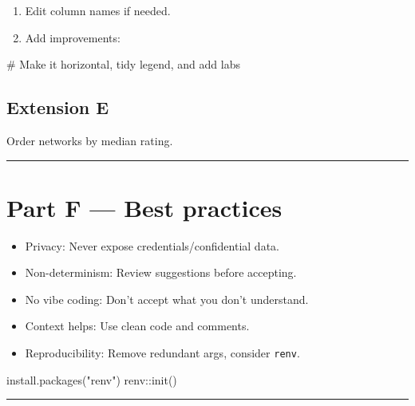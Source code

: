 \documentclass[
  letterpaper,
  DIV=11,
  numbers=noendperiod]{scrreprt}
\newenvironment{Shaded}{\begin{snugshade}}{\end{snugshade}}
\newcommand{\CommentTok}[1]{\textcolor[rgb]{0.37,0.37,0.37}{#1}}
\newcommand{\FunctionTok}[1]{\textcolor[rgb]{0.28,0.35,0.67}{#1}}
\newcommand{\NormalTok}[1]{\textcolor[rgb]{0.00,0.23,0.31}{#1}}
\newcommand{\SpecialCharTok}[1]{\textcolor[rgb]{0.37,0.37,0.37}{#1}}
\newcommand{\StringTok}[1]{\textcolor[rgb]{0.13,0.47,0.30}{#1}}
\providecommand{\tightlist}{%
  \setlength{\itemsep}{0pt}\setlength{\parskip}{0pt}}
\begin{document}
\begin{enumerate}
\def\labelenumi{\arabic{enumi}.}
\setcounter{enumi}{1}
\tightlist
\item
  Edit column names if needed.
\item
  Add improvements:
\end{enumerate}

\begin{Shaded}
\begin{Highlighting}[]
\CommentTok{\# Make it horizontal, tidy legend, and add labs}
\end{Highlighting}
\end{Shaded}

\subsection{Extension E}\label{extension-e}

Order networks by median rating.

\begin{center}\rule{0.5\linewidth}{0.5pt}\end{center}

\section{Part F --- Best practices}\label{part-f-best-practices}

\begin{itemize}
\tightlist
\item
  Privacy: Never expose credentials/confidential data.
\item
  Non-determinism: Review suggestions before accepting.
\item
  No vibe coding: Don't accept what you don't understand.
\item
  Context helps: Use clean code and comments.
\item
  Reproducibility: Remove redundant args, consider \texttt{renv}.
\end{itemize}

\begin{Shaded}
\begin{Highlighting}[]
\FunctionTok{install.packages}\NormalTok{(}\StringTok{"renv"}\NormalTok{)}
\NormalTok{renv}\SpecialCharTok{::}\FunctionTok{init}\NormalTok{()}
\end{Highlighting}
\end{Shaded}

\begin{center}\rule{0.5\linewidth}{0.5pt}\end{center}
\end{document}
